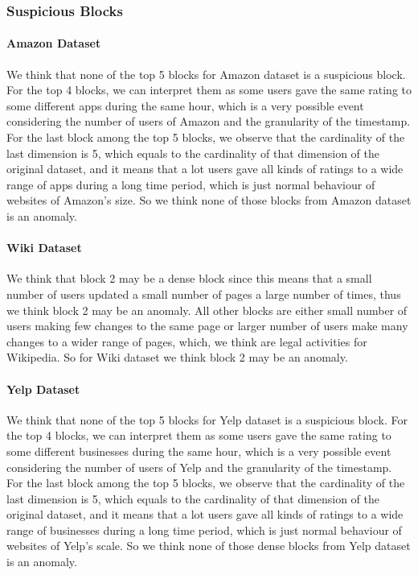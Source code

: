 \subsubsection{Suspicious Blocks}
\paragraph{Amazon Dataset} We think that none of the top 5 blocks for Amazon dataset is a suspicious block. For the top 4 blocks, we can interpret them as some users gave the same rating to some different apps during the same hour, which is a
very possible event considering the number of users of Amazon and the granularity of the timestamp. For the last block among the top 5 blocks, we observe that the cardinality of the last dimension is 5, which equals to the cardinality of
that dimension of the original dataset, and it means that a lot users gave all kinds of ratings to a wide range of apps during a long time period, which is just normal behaviour of websites of Amazon's size.
So we think none of those blocks from Amazon dataset is an anomaly.
\paragraph{Wiki Dataset} We think that block 2 may be a dense block since this means that a small number of users updated a small number of pages a large number of times, thus we think block 2 may be an anomaly. All other blocks are either
small number of users making few changes to the same page or larger number of users make many changes to a wider range of pages, which, we think are legal activities for Wikipedia. So for Wiki dataset we think block 2 may be an anomaly.
\paragraph{Yelp Dataset} We think that none of the top 5 blocks for Yelp dataset is a suspicious block. For the top 4 blocks, we can interpret them as some users gave the same rating to some different businesses during the same hour, which is a
very possible event considering the number of users of Yelp and the granularity of the timestamp. For the last block among the top 5 blocks, we observe that the cardinality of the last dimension is 5, which equals to the cardinality of
that dimension of the original dataset, and it means that a lot users gave all kinds of ratings to a wide range of businesses during a long time period, which is just normal behaviour of websites of Yelp's scale.
So we think none of those dense blocks from Yelp dataset is an anomaly.

